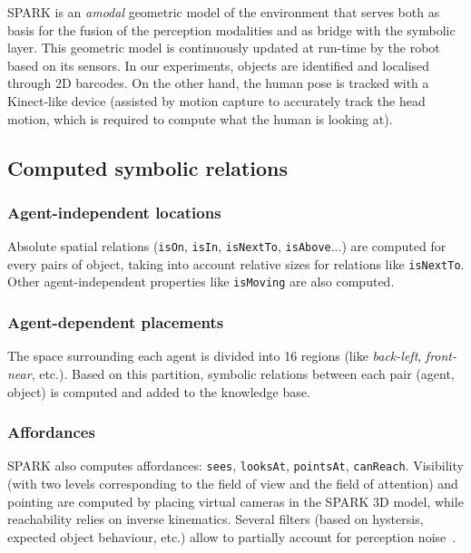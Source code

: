 \documentclass[letterpaper, 10 pt, conference]{ieeeconf}  %
\newcommand{\concept}[1]{{\small \texttt{#1}}}
\begin{document}
SPARK is an \emph{amodal} geometric model of the environment that serves both
as basis for the fusion of the perception modalities and as bridge with the
symbolic layer. This geometric model is continuously updated at run-time by the
robot based on its sensors. In our experiments, objects are identified and
localised through 2D barcodes.  On the other hand, the human pose is tracked
with a Kinect-like device (assisted by motion capture to accurately track the
head motion, which is required to compute what the human is looking at).

\subsection{Computed symbolic relations}

\subsubsection{Agent-independent locations}

Absolute spatial relations (\concept{isOn}, \concept{isIn}, \concept{isNextTo},
\concept{isAbove}...) are computed for every pairs of object, taking into
account relative sizes for relations like \concept{isNextTo}. Other
agent-independent properties like \concept{isMoving} are also computed.

\subsubsection{Agent-dependent placements}

The space surrounding each agent is divided into 16 regions (like
\emph{back-left}, \emph{front-near}, etc.). Based on this partition, symbolic
relations between each pair (agent, object) is computed and added to the
knowledge base.

\subsubsection{Affordances}

SPARK also computes affordances: \concept{sees}, \concept{looksAt},
\concept{pointsAt}, \concept{canReach}. Visibility (with two levels
corresponding to the field of view and the field of attention) and pointing are
computed by placing virtual cameras in the SPARK 3D model, while reachability
relies on inverse kinematics. Several filters (based on hystersis, expected
object behaviour, etc.) allow to partially account for perception
noise~\cite{Warnier2012a}.
\end{document}
